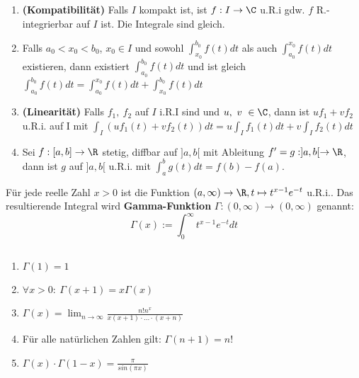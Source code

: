 \begin{theorem}
	\begin{enumerate}
    \item \textbf{(Kompatibilität)} Falls $I$ kompakt ist, ist $f: I \to \C $ u.R.i gdw. $f$ R.-integrierbar auf $I$ ist. Die Integrale sind gleich.
    \item Falls $a_0<x_0<b_0$, $x_0 \in I$ und sowohl $\int_{x_0}^{b_0} f(t) dt$ als auch $\int_{a_0}^{x_0} f(t) dt$ existieren, dann existiert $\int_{a_0}^{b_0} f(t) dt$ und ist gleich $\int_{a_0}^{b_0} f(t) dt = \int_{a_0}^{x_0} f(t) dt + \int_{x_0}^{b_0} f(t) dt$
    \item \textbf{(Linearität)} Falls $f_1 , \ f_2$ auf $I$ i.R.I sind und $u, \ v \ \in \C$, dann ist $uf_1+vf_2$ u.R.i. auf I mit $\int_I (uf_1(t) + vf_2(t)) dt = u\int_I f_1(t) dt +  v\int_I f_2(t) dt$
    \item Sei $f: [a,b] \to \R$ stetig, diffbar auf $]a,b[$ mit Ableitung $f' = g: ]a,b[ \to \R$, dann ist $g$ auf $]a,b[$ u.R.i. mit $\int_a^b g(t) dt = f(b) - f(a)$.
    \end{enumerate}
\end{theorem}

\begin{definition}
	Für jede reelle Zahl $x>0$ ist die Funktion $(a,\infty) \to \R, t \mapsto t^{x-1}e^{-t}$ u.R.i..
    Das resultierende Integral wird \textbf{Gamma-Funktion}  $\Gamma : (0,\infty) \to (0,\infty)$
    genannt:
    $$\Gamma(x) := \int_0^\infty t^{x-1}e^{-t} dt$$
\end{definition}

\begin{theorem} $ $\\
	\begin{enumerate}
	\item $\Gamma(1) = 1$
    \item $\forall x > 0 : \ \Gamma(x+1) = x\Gamma(x)$
    \item $\Gamma(x)  = \lim_{n\to \infty} \frac{n!n^x}{x(x+1)\cdot ... \cdot(x+n)}$
    \item Für alle natürlichen Zahlen gilt:  $\Gamma(n + 1) = n!$
    \item $\Gamma(x) \cdot \Gamma(1-x) = \frac{\pi}{sin(\pi x)}$
	\end{enumerate}
\end{theorem}

